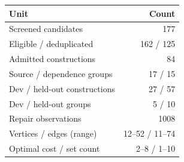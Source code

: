 \begin{tabular}{@{}lr@{}}
\toprule
Unit & Count\\
\midrule
Screened candidates & 177\\
Eligible / deduplicated & 162 / 125\\
Admitted constructions & 84\\
Source / dependence groups & 17 / 15\\
Dev / held-out constructions & 27 / 57\\
Dev / held-out groups & 5 / 10\\
Repair observations & 1008\\
Vertices / edges (range) & 12--52 / 11--74\\
Optimal cost / set count & 2--8 / 1--10\\
\bottomrule
\end{tabular}
